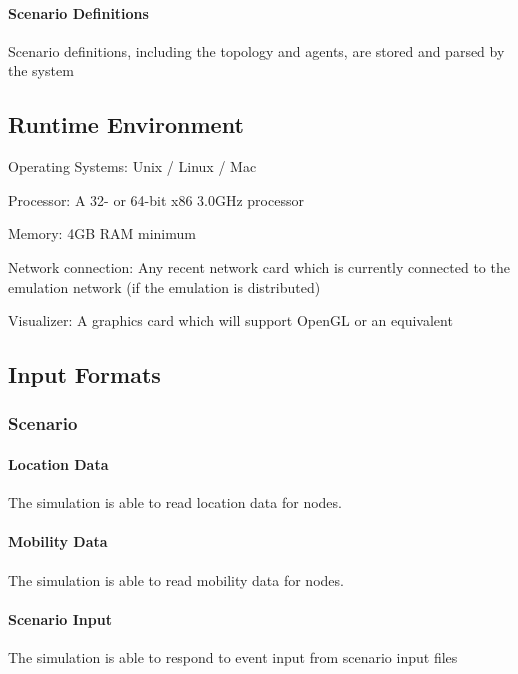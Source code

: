 \documentclass[titlepage]{article}
\begin{document}
    \paragraph{Scenario Definitions} Scenario definitions, including the topology and agents, are stored and parsed by the system


\subsection{Runtime Environment} 
\begin{itemize*}
    \item Operating Systems:  Unix / Linux / Mac
    \item Processor:  A 32- or 64-bit x86 3.0GHz processor
    \item Memory:  4GB RAM minimum
    \item Network connection:  Any recent network card which is currently connected to the emulation network (if the emulation is distributed)
    \item Visualizer:  A graphics card which will support OpenGL or an equivalent
\end{itemize*}


\subsection{Input Formats%
  \label{input-formats}%
}

\subsubsection{Scenario}
    \paragraph{Location Data} The simulation is able to read location data for nodes.
	\paragraph{Mobility Data} The simulation is able to read mobility data for nodes.
	\paragraph{Scenario Input} The simulation is able to respond to event input from scenario input files
\end{document}
